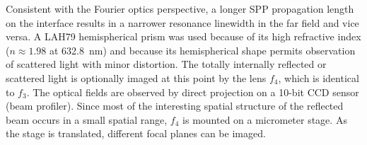 Consistent with the Fourier optics perspective, a longer SPP propagation
length on the interface results in a narrower resonance linewidth in the
far field and vice versa.  A LAH79 hemispherical prism was used because of
its high refractive index ($n\approx 1.98$ at \SI{632.8}{\nano\meter}) and
because its hemispherical shape permits observation of scattered light with
minor distortion.  The totally internally reflected or scattered light is
optionally imaged at this point by the lens $f_4$, which is identical to
$f_3$.  The optical fields are observed by direct projection on a 10-bit
CCD sensor (beam profiler).  Since most of the interesting spatial structure of the
reflected beam occurs in a small spatial range, $f_4$
is mounted on a micrometer stage.  As the stage is translated, different focal
planes can be imaged.

